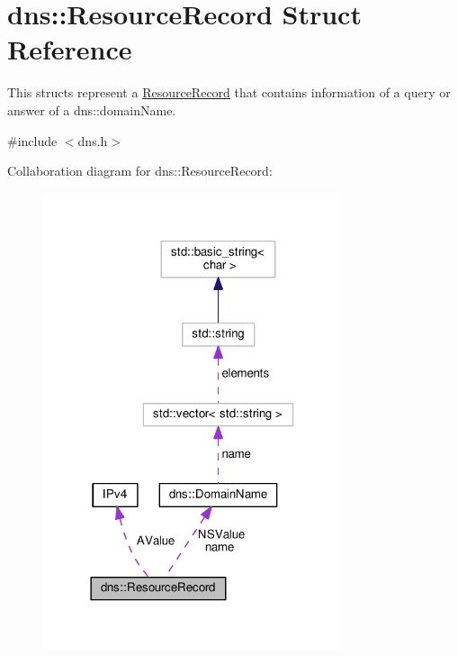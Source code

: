 \hypertarget{structdns_1_1ResourceRecord}{}\section{dns\+:\+:Resource\+Record Struct Reference}
\label{structdns_1_1ResourceRecord}


This structs represent a \hyperlink{structdns_1_1ResourceRecord}{Resource\+Record} that contains information of a query or answer of a dns\+::domain\+Name.  




{\ttfamily \#include $<$dns.\+h$>$}



Collaboration diagram for dns\+:\+:Resource\+Record\+:
\nopagebreak
\begin{figure}[H]
\begin{center}
\leavevmode
\includegraphics[width=249pt]{structdns_1_1ResourceRecord__coll__graph}
\end{center}
\end{figure}
